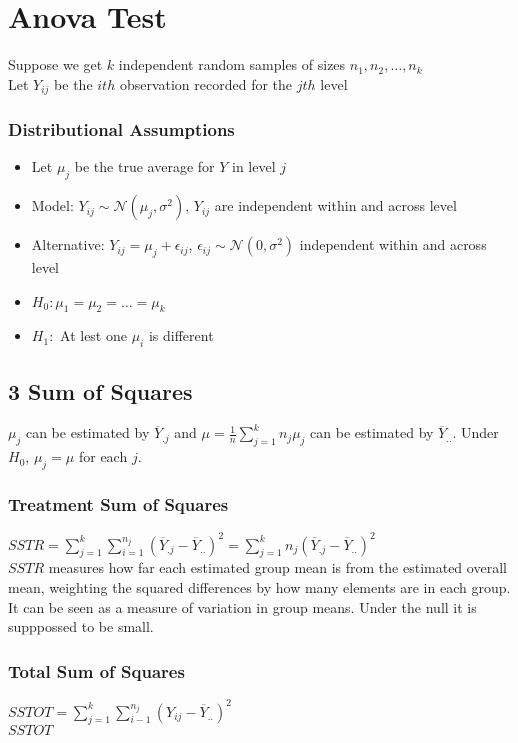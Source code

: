 \documentclass{article}
\begin{document}
\section{Anova Test}
\label{sec:anova}
Suppose we get $k$ independent random samples of sizes $n_1,n_2,\dots,n_k$\\
Let $Y_{ij}$ be the $ith$ observation recorded for the $jth$ level
\subsubsection{Distributional Assumptions}
\begin{itemize}
    \item Let $\mu_j$ be the true average for $Y$ in level $j$
    \item Model: $Y_{ij}\sim\mathcal{N}(\mu_j,\sigma^2)$, $Y_{ij}$ are independent within and across level
    \item Alternative: $Y_{ij}=\mu_j+\epsilon_{ij}$, $\epsilon_{ij}\sim\mathcal{N}(0,\sigma^2)$ independent within and across level
    \item $H_0: \mu_1=\mu_2=\dots=\mu_k$
    \item $H_1:$ At lest one $\mu_i$ is different
\end{itemize}
\subsection{3 Sum of Squares}
$\mu_j$ can be estimated by $\overline{Y}_{.j}$ and $\mu=\frac{1}{n}\sum_{j=1}^kn_j\mu_j$ can be estimated by $\overline{Y}_{..}$. Under $H_0$, $\mu_j=\mu$ for each $j$.
\subsubsection{Treatment Sum of Squares}
$SSTR=\sum_{j=1}^k\sum_{i=1}^{n_j}(\overline{Y}_{.j}-\overline{Y}_{..})^2=\sum_{j=1}^kn_j(\overline{Y}_{.j}-\overline{Y}_{..})^2$\\
$SSTR$ measures how far each estimated group mean is from the estimated overall mean, weighting the squared differences by how many elements are in each group. It can be seen as a measure of variation in group means. Under the null it is supppossed to be small.
\subsubsection{Total Sum of Squares}
$SSTOT=\sum_{j=1}^k\sum_{i-1}^{n_j}(Y_{ij}-\overline{Y}_{..})^2$\\
$SSTOT$
\end{document}
